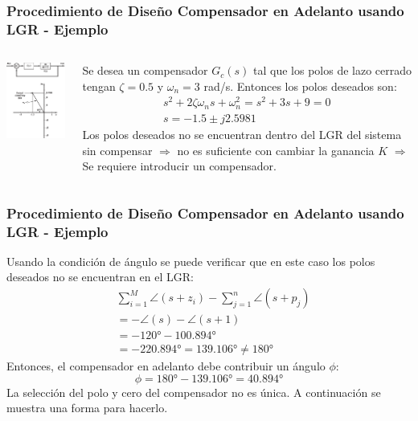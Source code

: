 \documentclass[aspectratio=169,handout]{beamer}
\theoremstyle{definition}
\theoremstyle{plain}
\theoremstyle{remark}
\begin{document}
\begin{frame}[c]\frametitle{Procedimiento de Diseño Compensador en Adelanto usando LGR - Ejemplo}
	\vspace*{5mm}
	\begin{columns}
		\begin{column}{0.4\textwidth}
			\includegraphics[width=5cm]{images/ejemplo1_compensador.eps}	
		\end{column}
		\begin{column}{0.6\textwidth}
			Se desea un compensador $G_c(s)$ tal que los polos de lazo cerrado tengan $\zeta = 0.5$ y $\omega_n =3$ rad/s. Entonces los polos deseados son:
			\begin{align*}
				s^2 + 2\zeta \omega_n s + \omega_n^2 = s^2 + 3s + 9 = 0\\
				s = -1.5 \pm j2.5981
		 	\end{align*}
		 	\pause
		 	Los polos deseados no se encuentran dentro del LGR del sistema sin compensar $\Rightarrow$ no es suficiente con cambiar la ganancia $K$ $\Rightarrow$ Se requiere introducir un compensador.
		\end{column}
	\end{columns}
\end{frame}

\begin{frame}[c]\frametitle{Procedimiento de Diseño Compensador en Adelanto usando LGR - Ejemplo}
Usando la condición de ángulo se puede verificar que en este caso los polos deseados no se encuentran en el LGR:
\pause
\begin{align*}
	&\sum_{i=1}^M \angle(s+z_i) - \sum_{j=1}^n \angle(s+p_j)\\
	&= -\angle(s) - \angle(s+1)\\
	&= -\ang{120} - \ang{100.894}\\
	&= -\ang{220.894} = \ang{139.106} \neq \ang{180}
\end{align*}
\pause
Entonces, el compensador en adelanto debe contribuir un ángulo $\phi$:
\begin{equation*}
	\phi = \ang{180} - \ang{139.106} = \ang{40.894}
\end{equation*}
\pause
La selección del polo y cero del compensador no es única. A continuación se muestra una forma para hacerlo.
\end{frame}
\end{document}
